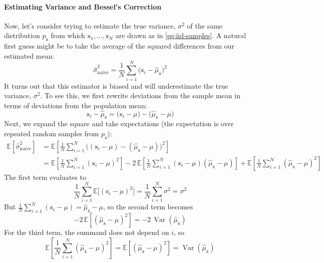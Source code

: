 \paragraph*{Estimating Variance and Bessel's Correction}
Now, let's consider trying to estimate the true variance, $\sigma^2$ of the same distribution $p_\mathsf{x}$ from which $\mathsf{x}_1,\ldots,\mathsf{x}_N$ are drawn as in \autoref{eq:iid-samples}. A natural first guess might be to take the average of the squared differences from our estimated mean:
\begin{equation}
\hat{\sigma}^{2}_{\text{naive}} = \frac{1}{N}\sum_{i=1}^{N}\!\bigl(\mathsf{x}_i-\hat{\mu}_{\mathsf{x}}\bigr)^{2}
\end{equation}
It turns out that this estimator is biased and will underestimate the true variance, $\sigma^2$. To see this, we first rewrite deviations from the sample mean in terms of deviations from the population mean:
\begin{equation}
    \mathsf{x}_i-\hat{\mu}_{\mathsf{x}} =\bigl(\mathsf{x}_i-\mu\bigr)-\bigl(\hat{\mu}_{\mathsf{x}}-\mu\bigr)
\end{equation}
Next, we expand the square and take expectations (the expectation is over repeated random samples from $p_\mathsf{x}$):
\begin{align}
    \mathbb{E}\!\left[\hat{\sigma}^{2}_{\text{naive}}\right]
    &=\mathbb{E}\!\left[\frac{1}{N}\sum_{i=1}^{N}\!\bigl((\mathsf{x}_i-\mu)-(\hat{\mu}_{\mathsf{x}}-\mu)\bigr)^{2}\right] \nonumber \\
    &=\mathbb{E}\!\left[\frac{1}{N}\sum_{i=1}^{N}(\mathsf{x}_i-\mu)^{2}\right] -2\,\mathbb{E}\!\left[\frac{1}{N}\sum_{i=1}^{N}(\mathsf{x}_i-\mu)(\hat{\mu}_{\mathsf{x}}-\mu)\right] +\mathbb{E}\!\left[\frac{1}{N}\sum_{i=1}^{N}(\hat{\mu}_{\mathsf{x}}-\mu)^{2}\right]
\end{align}
The first term evaluates to
\begin{equation}
    \frac{1}{N}\sum_{i=1}^{N}\mathbb{E}\!\big[(\mathsf{x}_i-\mu)^{2}\big]=\frac{1}{N}\sum_{i=1}^{N}\sigma^{2}
    =\sigma^{2}
\end{equation}
But $\frac{1}{N}\sum_{i=1}^{N}(\mathsf{x}_i-\mu)=\hat{\mu}_{\mathsf{x}}-\mu$, so the second term becomes
\begin{equation}
    -2\,\mathbb{E}\!\left[(\hat{\mu}_{\mathsf{x}}-\mu)^{2}\right]
    = -2\,\operatorname{Var}(\hat{\mu}_{\mathsf{x}})
\end{equation}
For the third term, the summand does not depend on $i$, so
\begin{equation}
    \mathbb{E}\!\left[\frac{1}{N}\sum_{i=1}^{N}(\hat{\mu}_{\mathsf{x}}-\mu)^{2}\right]
    =\mathbb{E}\!\left[(\hat{\mu}_{\mathsf{x}}-\mu)^{2}\right]
    =\operatorname{Var}(\hat{\mu}_{\mathsf{x}})
\end{equation}

